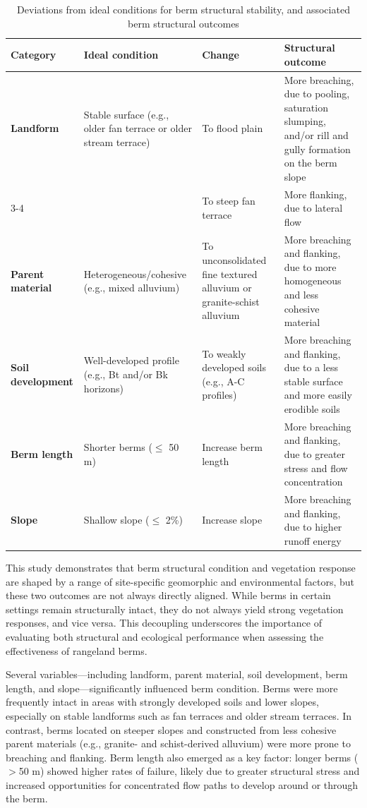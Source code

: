 \documentclass[review]{elsarticle}
\begin{document}
\begin{table}[h!]
\centering
\caption{\normalsize Deviations from ideal conditions for berm structural stability, and associated berm structural outcomes}
\small
\begin{tabular}{|p{3 cm}|p{3.5cm}|p{3.5cm}|p{4cm}|}
\hline
\textbf{Category} & \textbf{Ideal condition} & \textbf{Change} & \textbf{Structural outcome } \\
\hline
\textbf{Landform} & Stable surface (e.g., older fan terrace or older stream terrace) & To flood plain & More breaching, due to pooling, saturation slumping, and/or rill and gully formation on the berm slope\\
\cline{3-4}
 & & To steep fan terrace & More flanking, due to lateral flow \\
\hline
\textbf{Parent material} & Heterogeneous/cohesive (e.g., mixed alluvium) & To unconsolidated fine textured alluvium or granite-schist alluvium & More breaching and flanking, due to more homogeneous and less cohesive material \\
\hline
\textbf{Soil development} & Well-developed profile (e.g., Bt and/or Bk horizons) & To weakly developed soils (e.g., A-C profiles) & More breaching and flanking, due to a less stable surface and more easily erodible soils \\
\hline
\textbf{Berm length} & Shorter berms ($\leq$ 50 m) & Increase berm length & More breaching and flanking, due to greater stress and flow concentration \\
\hline
\textbf{Slope} & Shallow slope ($\leq$ 2\%) & Increase slope & More breaching and flanking, due to higher runoff energy \\
\hline
\end{tabular}
\label{tab:berm_outcomes}
\end{table}

This study demonstrates that berm structural condition and vegetation response are shaped by a range of site-specific geomorphic and environmental factors, but these two outcomes are not always directly aligned. While berms in certain settings remain structurally intact, they do not always yield strong vegetation responses, and vice versa. This decoupling underscores the importance of evaluating both structural and ecological performance when assessing the effectiveness of rangeland berms.

Several variables—including landform, parent material, soil development, berm length, and slope—significantly influenced berm condition. Berms were more frequently intact in areas with strongly developed soils and lower slopes, especially on stable landforms such as fan terraces and older stream terraces. In contrast, berms located on steeper slopes and constructed from less cohesive parent materials (e.g., granite- and schist-derived alluvium) were more prone to breaching and flanking. Berm length also emerged as a key factor: longer berms ($>$50 m) showed higher rates of failure, likely due to greater structural stress and increased opportunities for concentrated flow paths to develop around or through the berm.
\end{document}
